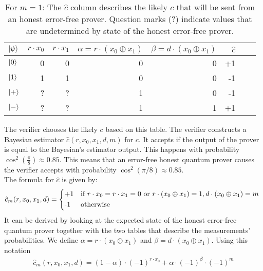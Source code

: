 \documentclass{article}
\begin{document}
\begin{table}[ht]
  \centering
  \begin{tabular}{|l|r|r|r|r|r|r|r|}
    \hline
    $\ket{\psi}$ & 
    $r\cdot x_{0}$ & $r\cdot x_{1}$ & $\alpha=r\cdot (x_{0}\oplus x_{1})$ &  $\beta=d\cdot (x_{0}\oplus x_{1})$ &
    $\hat{c}$ \\
    \hline
    $\ket{0}$   & 0 & 0 & 0 & 0 & +1  \\
    $\ket{1}$  & 1 & 1 & 0 & 0 & -1 \\
    $\ket{+}$  & ? & ? & 1 & 0 & -1 \\
    $\ket{-}$   & ? & ? & 1 & 1 & +1\\
    \hline
  \end{tabular}
 
\caption{For $m=1$: The $\hat{c}$ column describes the likely $c$ that will be sent from an honest error-free prover. Question marks (?) indicate values that are undetermined by state of the honest error-free prover.}
\label{probs2}

\end{table}
The verifier chooses the likely $c$ based on this table. The verifier constructs a Bayesian estimator  $\hat{c}(r,x_{0},x_{1},d,m)$ for $c$. It accepts if the output of the prover is equal to the Bayesian's estimator output. This happens with probability $\cos^{2}\left(\frac{\pi}{8}\right) \approx 0.85$. This means that an error-free honest quantum prover causes the verifier accepts with probability $\cos^{2}(\pi/8)\approx 0.85$. 
\\
The formula for $\hat{c}$ is given by:
\begin{align}\hat{c}_{m}(r,x_{0},x_{1},d) = \begin{cases*}
                    $+1$ & if  $r\cdot x_{0} = r\cdot x_{1} = 0$ or $r \cdot (x_{0} \oplus x_{1}) = 1, d \cdot (x_{0} \oplus x_{1})=m$  \\
                     $-1$ & otherwise
                 \end{cases*} \end{align} It can be derived by looking at the expected state of the honest error-free quantum prover together with the two tables that describe the measurements' probabilities. We define $\alpha = r\cdot(x_{0}\oplus x_{1})$ and $\beta = d\cdot (x_{0}\oplus x_{1})$. Using this notation
\begin{align}\label{cm}\hat{c}_{m}(r,x_{0},x_{1},d) = (1-\alpha) \cdot (-1)^{r\cdot x_{0}} + \alpha \cdot (-1)^{\beta} \cdot (-1)^{m}\end{align} 
\end{document}
